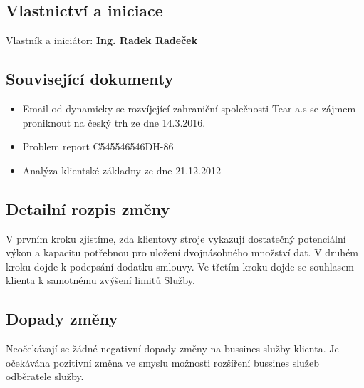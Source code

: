 \documentclass[11pt, a4paper, titlepage]{article}
\begin{document}
	\subsection{Vlastnictví a iniciace}

	Vlastník a iniciátor: \textbf{Ing. Radek Radeček}

	\subsection{Související dokumenty}
	\begin{itemize}
		\item Email od dynamicky se rozvíjející zahraniční společnosti Tear a.s se zájmem proniknout na český trh ze dne 14.3.2016.
		\item Problem report C545546546DH-86
		\item Analýza klientské základny ze dne 21.12.2012
	\end{itemize}

	\subsection{Detailní rozpis změny}

	V prvním kroku zjistíme, zda klientovy stroje vykazují dostatečný potenciální výkon a kapacitu potřebnou pro uložení dvojnásobného množství dat. V druhém kroku dojde k podepsání dodatku smlouvy. Ve třetím kroku dojde se souhlasem klienta k samotnému zvýšení limitů Služby.

	\subsection{Dopady změny}

	Neočekávají se žádné negativní dopady změny na bussines služby klienta. Je očekávána pozitivní změna ve smyslu možnosti rozšíření bussines služeb odběratele služby. 
\end{document}
